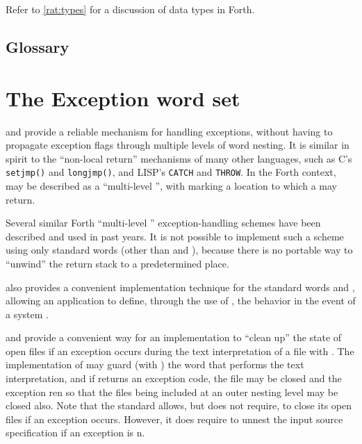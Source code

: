 Refer to \ref{rat:types} for a discussion of data types in Forth.

\setcounter{subsection}{5}
\subsection{Glossary} %



\section{The Exception word set} %
\label{rat:exception}

 and  provide a reliable mechanism for
handling exceptions, without having to propagate exception flags
through multiple levels of word nesting. It is similar in spirit
to the ``non-local return'' mechanisms of many other languages,
such as C's \texttt{setjmp()} and \texttt{longjmp()}, and LISP's
\texttt{CATCH} and \texttt{THROW}. In the Forth context, 
may be described as a ``multi-level '', with
 marking a location to which a  may return.

Several similar Forth ``multi-level ''
exception-handling schemes have been described and used in past years.
It is not possible to implement such a scheme using only standard words
(other than  and ), because there is no portable
way to ``unwind'' the return stack to a predetermined place.

 also provides a convenient implementation technique for
the standard words  and , allowing an
application to define, through the use of , the behavior
in the event of a system .

 and  provide a convenient way for an
implementation to ``clean up'' the state of open files if an
exception occurs during the text interpretation of a file with
. The implementation of
 may guard (with ) the word
that performs the text interpretation, and if  returns
an exception code, the file may be closed and the exception
ren so that the files being included at an outer nesting
level may be closed also. Note that the standard allows, but does not
require,  to close its open files if an
exception occurs. However, it does require 
to unnest the input source specification if an exception is
n.


